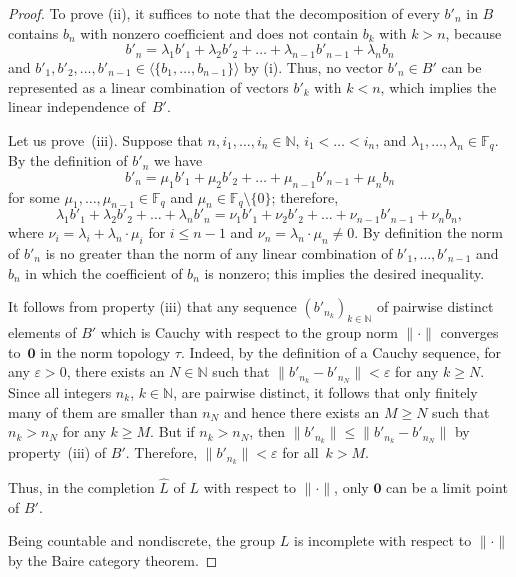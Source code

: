 \documentclass[a4paper]{amsart}
\theoremstyle{definition}
\let\le\leqslant
\let\ge\geqslant
\begin{document}
\begin{proof}
To prove (ii), it suffices to note that the decomposition of every $b'_n$ in $B$  
contains $b_n$ with nonzero coefficient and does not contain $b_k$ with $k>n$, because 
$$
b'_n=\lambda_1 b'_1+ \lambda_2b'_2+ \dots +\lambda_{n-1}b'_{n-1}+\lambda_n b_n
$$ 
and 
$b'_1, b'_2, \dots, b'_{n-1}\in \langle \{b_1, \dots, b_{n-1}\}\rangle$ by (i). Thus, no vector $b'_n\in B'$ 
can be represented as a linear combination of vectors $b'_k$ with $k<n$, which implies the  
linear independence of~$B'$.

Let us prove~(iii). Suppose that $n, i_1,\dots, i_n\in \mathbb N$, $i_1<\dots <i_n$, and 
$\lambda_1,\dots,\lambda_n\in \mathbb F_q$. By the definition of $b'_n$ we have 
$$
b'_n=\mu_1 b'_1+ \mu_2b'_2+ \dots +\mu_{n-1}b'_{n-1}+\mu_n b_n 
$$
for some $\mu_1, \dots, \mu_{n-1}\in \mathbb F_q$ and $\mu_n\in \mathbb F_q\setminus \{0\}$; therefore, 
$$
\lambda_1 b'_1+ \lambda_2b'_2+ \dots +\lambda_n b'_n = 
\nu_1 b'_1+\nu_2 b'_2 + \dots + \nu_{n-1} b'_{n-1}+ \nu_n b_n,
$$
where $\nu_i = \lambda_i + \lambda_n\cdot \mu_i$ for $i\le n-1$ and $\nu_n=\lambda_n\cdot \mu_n\ne 0$. 
 By definition the norm of $b'_n$ is no greater than the norm of any linear combination of 
$b'_1, \dots, b'_{n-1}$ and $b_n$ in which the coefficient of $b_n$ is nonzero; this 
implies the desired inequality.  

\smallskip

It follows from property (iii) that any sequence $(b'_{n_k})_{k\in \mathbb N}$ of pairwise distinct elements 
of $B'$ which is Cauchy with 
respect to the group norm $\lVert\boldsymbol\cdot\rVert$ converges to~$\mathbf 0$ in the norm topology $\tau$. 
Indeed, by the definition of a 
Cauchy sequence, for any $\varepsilon >0$, there exists an $N\in \mathbb N$ such that 
$\|b'_{n_{k}}-b'_{n_N}\|< \varepsilon$ for any $k\ge N$. Since all integers $n_k$, $k\in \mathbb N$, 
are pairwise distinct, it follows that only finitely many of them are smaller than $n_N$ and hence there exists 
an $M\ge N$ such that $n_k>n_N$ for any $k\ge M$. 
But if $n_k > n_N$, then 
$\|b'_{n_k}\|\le \|b'_{n_k}-b'_{n_N}\|$ by property~(iii) of $B'$. Therefore, 
$\|b'_{n_k}\|<\varepsilon$ for all~$k > M$. 

Thus, in the completion $\widehat L$ of $L$ with respect to $\lVert\boldsymbol\cdot\rVert$, only $\mathbf 0$ 
can be a limit point of $B'$. 

Being countable and nondiscrete, the group $L$ is incomplete with respect to $\lVert\boldsymbol\cdot\rVert$ by 
the Baire category theorem. 
\end{proof}
\end{document}
